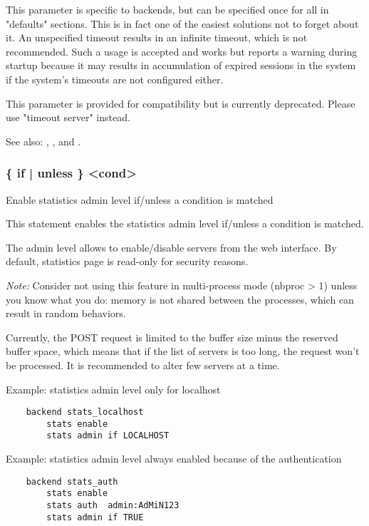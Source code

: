 {  This parameter is specific to backends, but can be specified once for all in
  "defaults" sections. This is in fact one of the easiest solutions not to
  forget about it. An unspecified timeout results in an infinite timeout, which
  is not recommended. Such a usage is accepted and works but reports a warning
  during startup because it may results in accumulation of expired sessions in
  the system if the system's timeouts are not configured either.

  This parameter is provided for compatibility but is currently deprecated.
  Please use "timeout server" instead.

  See also: , ,  and
             .

\subsubsection[stats admin]{ \{ if | unless \} <cond>}

  Enable statistics admin level if/unless a condition is matched


  This statement enables the statistics admin level if/unless a condition is
  matched.

  The admin level allows to enable/disable servers from the web interface. By
  default, statistics page is read-only for security reasons.

  \emph{Note:} Consider not using this feature in multi-process mode (nbproc > 1)
         unless you know what you do: memory is not shared between the
         processes, which can result in random behaviors.

  Currently, the POST request is limited to the buffer size minus the reserved
  buffer space, which means that if the list of servers is too long, the
  request won't be processed. It is recommended to alter few servers at a
  time.
  
  Example: statistics admin level only for localhost
  \begin{verbatim}
    backend stats_localhost
        stats enable
        stats admin if LOCALHOST
  \end{verbatim}

  Example: statistics admin level always enabled because of the authentication
  \begin{verbatim}
    backend stats_auth
        stats enable
        stats auth  admin:AdMiN123
        stats admin if TRUE
  \end{verbatim}

}
